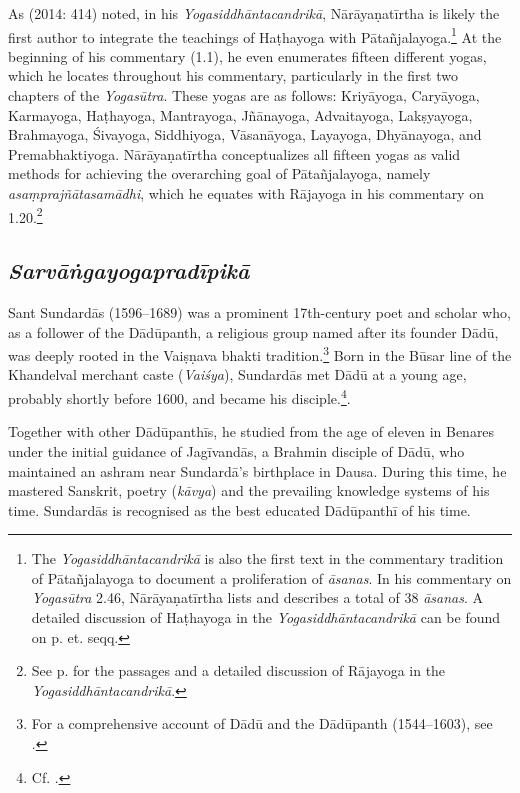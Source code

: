 As \citeauthor{birch2014} (2014: 414) noted, in his \emph{Yogasiddhāntacandrikā}, Nārāyaṇatīrtha is likely the first author to integrate the teachings of Haṭhayoga with Pātañjalayoga.\footnote{The \emph{Yogasiddhāntacandrikā} is also the first text in the commentary tradition of Pātañjalayoga to document a proliferation of \textit{āsanas}. In his commentary on \emph{Yogasūtra} 2.46, Nārāyaṇatīrtha lists and describes a total of 38 \textit{āsanas}. A detailed discussion of Haṭhayoga in the \emph{Yogasiddhāntacandrikā} can be found on p. \pageref{hathacandrika} et. seqq.} At the beginning of his commentary (1.1), he even enumerates fifteen different yogas, which he locates throughout his commentary, particularly in the first two chapters of the \emph{Yogasūtra}. These yogas are as follows: Kriyāyoga, Caryāyoga, Karmayoga, Haṭhayoga, Mantrayoga, Jñānayoga, Advaitayoga, Lakṣyayoga, Brahmayoga, Śivayoga, Siddhiyoga, Vāsanāyoga, Layayoga, Dhyānayoga, and Premabhaktiyoga. Nārāyaṇatīrtha conceptualizes all fifteen yogas as valid methods for achieving the overarching goal of Pātañjalayoga, namely \textit{asaṃprajñātasamādhi}, which he equates with Rājayoga in his commentary on 1.20.\footnote{See p. \pageref{rajacandrika} for the passages and a detailed discussion of Rājayoga in the \emph{Yogasiddhāntacandrikā}.}

\subsection{\emph{Sarvāṅgayogapradīpikā}}

Sant Sundardās (1596–1689) was a prominent 17th-century poet and scholar who, as a follower of the Dādūpanth, a religious group named after its founder Dādū, was deeply rooted in the Vaiṣṇava bhakti tradition.\footnote{For a comprehensive account of Dādū and the Dādūpanth (1544–1603), see \citeauthor[2023: 71–77]{horstmann2023shrine}.} Born in the Būsar line of the Khandelval merchant caste (\textit{Vaiśya}), Sundardās met Dādū at a young age, probably shortly before 1600, and became his disciple.\footnote{Cf. \citeauthor[2023: 86]{horstmann2023shrine}.}.

Together with other Dādūpanthīs, he studied from the age of eleven in Benares under the initial guidance of Jagīvandās, a Brahmin disciple of Dādū, who maintained an ashram near Sundardā's birthplace in Dausa. During this time, he mastered Sanskrit, poetry (\textit{kāvya}) and the prevailing knowledge systems of his time. Sundardās is recognised as the best educated Dādūpanthī of his time.

